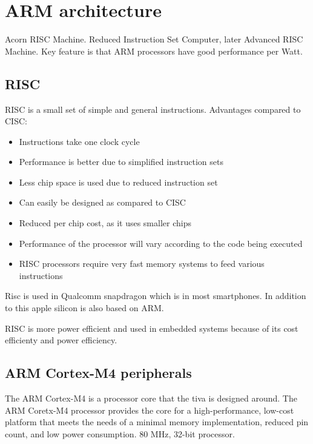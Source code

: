 \section{ARM architecture}

Acorn RISC Machine. Reduced Instruction Set Computer, later Advanced RISC Machine.
Key feature is that ARM processors have good performance per Watt.



\subsection{RISC}

RISC is a small set of simple and general instructions.
Advantages compared to CISC:
\begin{itemize}
	\item Instructions take one clock cycle
	\item Performance is better due to simplified instruction sets
	\item Less chip space is used due to reduced instruction set
	\item Can easily be designed as compared to CISC
	\item Reduced per chip cost, as it uses smaller chips
\end{itemize}

\begin{itemize}
	\item Performance of the processor will vary according to the code being executed
	\item RISC processors require very fast memory systems to feed various instructions
\end{itemize}

Risc is used in Qualcomm snapdragon which is in most smartphones.
In addition to this apple silicon is also based on ARM.

RISC is more power efficient and used in embedded systems because
of its cost efficienty and power efficiency.

\subsection{ARM Cortex-M4 peripherals}

The ARM Cortex-M4 is a processor core that the tiva is designed around.
The ARM Coretx-M4 processor provides the core for a high-performance,
low-cost platform that meets the needs of a minimal memory implementation,
reduced pin count, and low power consumption.
80 MHz, 32-bit processor.

